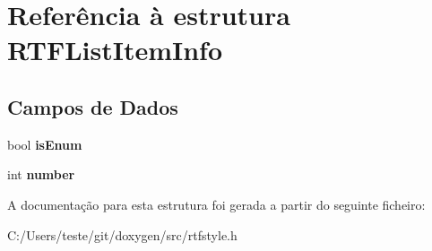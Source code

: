 \hypertarget{struct_r_t_f_list_item_info}{\section{Referência à estrutura R\-T\-F\-List\-Item\-Info}
\label{struct_r_t_f_list_item_info}
}
\subsection*{Campos de Dados}
\begin{DoxyCompactItemize}
\item 
\hypertarget{struct_r_t_f_list_item_info_a7395af8c815ea4f0db50fd4a3e47d1b6}{bool {\bfseries is\-Enum}}\label{struct_r_t_f_list_item_info_a7395af8c815ea4f0db50fd4a3e47d1b6}

\item 
\hypertarget{struct_r_t_f_list_item_info_a7106e2abc437ad981830d14176d15f09}{int {\bfseries number}}\label{struct_r_t_f_list_item_info_a7106e2abc437ad981830d14176d15f09}

\end{DoxyCompactItemize}


A documentação para esta estrutura foi gerada a partir do seguinte ficheiro\-:\begin{DoxyCompactItemize}
\item 
C\-:/\-Users/teste/git/doxygen/src/rtfstyle.\-h\end{DoxyCompactItemize}
